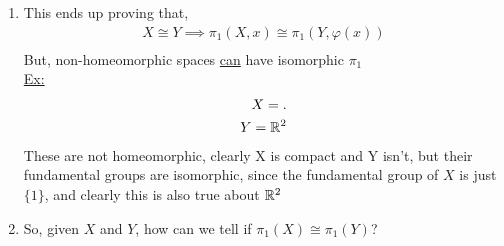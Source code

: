 \begin{enumerate}
\begin{proof}
                    (Note that this is doable, because $\varphi$ is a homeomorphism, $\varphi^{-1}:Y\rightarrow X$ exists, and is continuous)\\
                    To check this:
                    \begin{align*}
                        \varphi_{*}\circ (\varphi^{-1})\\
                        =(\varphi\circ\varphi^{-1}),\ \text{by lemma 1 shown today}\\
                        =id_{*},\ \text{by definition of $\varphi^{-1}$ (identity on y)}\\
                        =id,\ \text{by lemma 2 shown today (identity on x)}\\
                        (\varphi^{-1})_{*}\circ\varphi_{*}=(\varphi^{-1}\circ\varphi)_{*}=id_{*}=id\\
                    \end{align*}
                    This by definition means $\varphi_{*}$ and $(\varphi^{-1})_{*}$ are inverse functions.
                    Additionally, this small red box has made it onto the board, for clarification.
                    \begin{align*}
                        id_x: X \rightarrow Y\\
                        id_{\pi_1(X,x)}:\pi_1(X,x)\rightarrow\pi_1(X,x)\\
                        \text{Lemma: }(id_{x})_{*}id_{\pi_1(X,x)}\\
                    \end{align*}
                \end{proof}
        \item
            This ends up proving that,
            \begin{align*}
                X\cong Y\implies\pi_1(X,x)\cong\pi_1(Y,\varphi(x))\\
            \end{align*}
            But, non-homeomorphic spaces \underline{can} have isomorphic $\pi_{1}$\\
            \underline{Ex:}
            \begin{align*}
                X=.\\
                Y=\mathbb{R}^2\\
            \end{align*}
            These are not homeomorphic, clearly X is compact and Y isn't, but their fundamental groups are
            isomorphic, since the fundamental group of $X$ is just $\{1\}$, and clearly this is also true
            about $\mathbb{R}^2$
        \item So, given $X$ and $Y$, how can we tell if $\pi_1(X)\cong\pi_1(Y)$?
    \end{enumerate}
